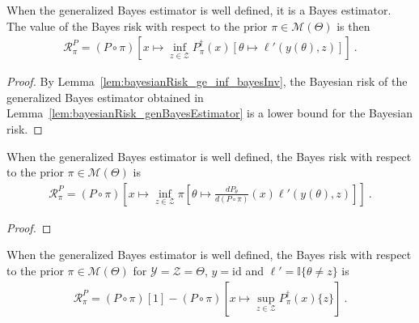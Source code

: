 \begin{theorem}
  \label{thm:isBayesEstimator_genBayesEstimator}
  \mathlibok
  When the generalized Bayes estimator is well defined, it is a Bayes estimator. The value of the Bayes risk with respect to the prior $\pi \in \mathcal M(\Theta)$ is then
  \begin{align*}
  \mathcal R^P_\pi = (P \circ \pi)\left[x \mapsto \inf_{z \in \mathcal Z} P_\pi^\dagger(x) \left[\theta \mapsto \ell'(y(\theta), z)\right]\right]
  \: .
  \end{align*}
\end{theorem}

\begin{proof}\mathlibok
{}
By Lemma~\ref{lem:bayesianRisk_ge_inf_bayesInv}, the Bayesian risk of the generalized Bayes estimator obtained in Lemma~\ref{lem:bayesianRisk_genBayesEstimator} is a lower bound for the Bayesian risk.
\end{proof}


\begin{lemma}
  \label{lem:bayesRisk_eq_rnDeriv}
  When the generalized Bayes estimator is well defined, the Bayes risk with respect to the prior $\pi \in \mathcal M(\Theta)$ is
  \begin{align*}
  \mathcal R^P_\pi = (P \circ \pi)\left[x \mapsto \inf_{z \in \mathcal Z} \pi \left[\theta \mapsto \frac{d P_\theta}{d (P \circ \pi)}(x) \ell'(y(\theta), z)\right]\right]
  \: .
  \end{align*}
\end{lemma}

\begin{proof}%
{}

\end{proof}


\begin{lemma}
  \label{lem:bayesRisk_binary_eq_sub_bayesInv}
  When the generalized Bayes estimator is well defined, the Bayes risk with respect to the prior $\pi \in \mathcal M(\Theta)$ for $\mathcal Y = \mathcal Z = \Theta$, $y = \mathrm{id}$ and $\ell' = \mathbb{I}\{\theta \ne z\}$ is
  \begin{align*}
  \mathcal R^P_\pi = (P \circ \pi)[1] - (P \circ \pi)\left[x \mapsto \sup_{z \in \mathcal Z} P_\pi^\dagger(x) \{z\}\right]
  \: .
  \end{align*}
\end{lemma}

